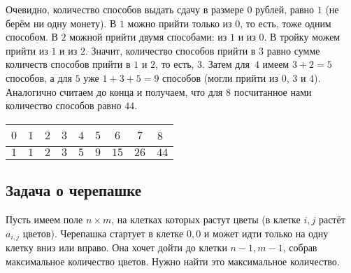 Очевидно, количество способов выдать сдачу в размере $0$ рублей, равно $1$ (не берём ни одну монету). В $1$ можно прийти только из $0$, то есть, тоже одним способом. В $2$ можной прийти двумя способами: из $1$ и из $0$. В тройку можем прийти из $1$ и из $2$. Значит, количество способов прийти в $3$ равно сумме количеств способов прийти в $1$ и $2$, то есть, $3$. Затем для~$4$ имеем $3 + 2 = 5$ способов, а для $5$ уже $1 + 3 + 5 = 9$ способов (могли прийти из $0$, $3$ и $4$). Аналогично считаем до конца и получаем, что для $8$ посчитанное нами количество способов равно $44$.

\begin{center}
\begin{tabular}{| c | c | c | c | c | c | c | c | c |}
    \rowcolor{lightgray}
    \hspace{.1cm} $0$ \hspace{.1cm} & \hspace{.1cm} $1$ \hspace{.1cm} & \hspace{.1cm} $2$ \hspace{.1cm} & \hspace{.1cm} $3$ \hspace{.1cm} & \hspace{.1cm} $4$ \hspace{.1cm} & \hspace{.1cm} $5$ \hspace{.1cm} & \hspace{.1cm} $6$ \hspace{.1cm} & \hspace{.1cm} $7$ \hspace{.1cm} & \hspace{.1cm} $8$ \hspace{.005cm} ${}$\\
    \hline
    $1$ & $1$ & $2$ & $3$ & $5$ & $9$ & $15$ & $26$ & $44$\\
\end{tabular}
\end{center}

\subsection{Задача о черепашке}

Пусть имеем поле $n \times m$, на клетках которых растут цветы (в клетке $i, j$ растёт $a_{i, j}$ цветов). Черепашка стартует в клетке $0, 0$ и может идти только на одну клетку вниз или вправо. Она хочет дойти до клетки $n - 1, m - 1$, собрав максимальное количество цветов. Нужно найти это максимальное количество.


